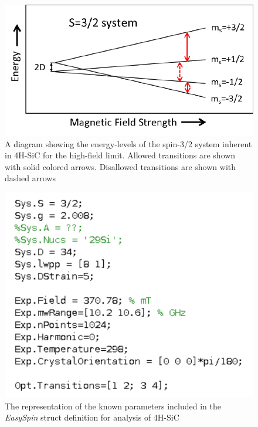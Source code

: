 \documentclass[oneside]{BYUPhys}
\begin{document}
\begin{figure}
    \centerline{\includegraphics{energy_levels_fig}}
    \caption[Energy Levels of 4H-SiC]{\label{fig:SiCEnergyLevels}
     A diagram showing the energy-levels of the spin-3/2 system inherent in 4H-SiC for the high-field limit. Allowed transitions are shown with solid colored arrows. Disallowed transitions are shown with dashed arrows}
 \end{figure}

\begin{figure}
    \centerline{\includegraphics{sic_params_commented_fig}}
    \caption[The \textit{EasySpin} Representation of SiC]{\label{fig:SiCParams}
     The representation of the known parameters included in the \textit{EasySpin} struct definition for analysis of 4H-SiC}
 \end{figure}
\end{document}
